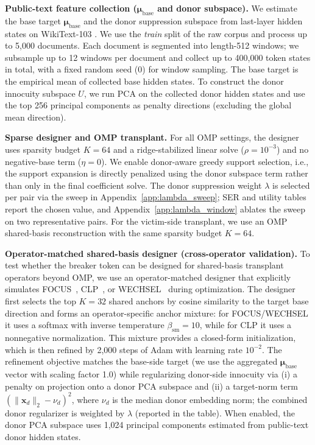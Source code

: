 \documentclass{article}
\theoremstyle{plain}
\theoremstyle{definition}
\theoremstyle{remark}
\begin{document}
\noindent\textbf{Public-text feature collection ($\boldsymbol{\mu}_{\text{base}}$ and donor subspace).}
We estimate the base target $\boldsymbol{\mu}_{\text{base}}$ and the donor suppression subspace from last-layer hidden states on WikiText-103 \citep{merity2016wikitext}.
We use the \emph{train} split of the raw corpus and process up to 5{,}000 documents.
Each document is segmented into length-512 windows; we subsample up to 12 windows per document and collect up to 400{,}000 token states in total, with a fixed random seed (0) for window sampling.
The base target is the empirical mean of collected base hidden states.
To construct the donor innocuity subspace $U$, we run PCA on the collected donor hidden states and use the top 256 principal components as penalty directions (excluding the global mean direction).

\noindent\textbf{Sparse designer and OMP transplant.}
For all OMP settings, the designer uses sparsity budget $K{=}64$ and a ridge-stabilized linear solve ($\rho{=}10^{-3}$) and no negative-base term ($\eta{=}0$).
We enable donor-aware greedy support selection, i.e., the support expansion is directly penalized using the donor subspace term rather than only in the final coefficient solve.
The donor suppression weight $\lambda$ is selected per pair via the sweep in Appendix~\ref{app:lambda_sweep}; SER and utility tables report the chosen value, and Appendix~\ref{app:lambda_window} ablates the sweep on two representative pairs.
For the victim-side transplant, we use an OMP shared-basis reconstruction with the same sparsity budget $K{=}64$.

\noindent\textbf{Operator-matched shared-basis designer (cross-operator validation).}
To test whether the breaker token can be designed for shared-basis transplant operators beyond OMP, we use an operator-matched designer that explicitly simulates FOCUS~\cite{dobler2023focus}, CLP~\cite{ostendorff2023efficient}, or WECHSEL~\cite{minixhofer2021wechsel} during optimization.
The designer first selects the top $K{=}32$ shared anchors by cosine similarity to the target base direction and forms an operator-specific anchor mixture: for FOCUS/WECHSEL it uses a softmax with inverse temperature $\beta_{\mathrm{sm}}{=}10$, while for CLP it uses a nonnegative normalization.
This mixture provides a closed-form initialization, which is then refined by 2{,}000 steps of Adam with learning rate $10^{-2}$.
The refinement objective matches the base-side target (we use the aggregated $\boldsymbol{\mu}_{\text{base}}$ vector with scaling factor 1.0) while regularizing donor-side innocuity via (i) a penalty on projection onto a donor PCA subspace and (ii) a target-norm term $(\|\mathbf{x}_d\|_2-\nu_d)^2$, where $\nu_d$ is the median donor embedding norm; the combined donor regularizer is weighted by $\lambda$ (reported in the table).
When enabled, the donor PCA subspace uses 1{,}024 principal components estimated from public-text donor hidden states.
\end{document}
